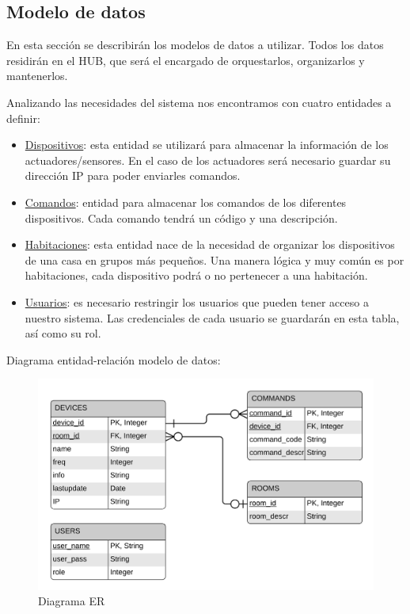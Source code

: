 \subsection{Modelo de datos}
En esta sección se describirán los modelos de datos a utilizar. Todos los datos residirán en el HUB, que será el encargado de orquestarlos,
organizarlos y mantenerlos.
\par
Analizando las necesidades del sistema nos encontramos con cuatro entidades a definir:
\begin{itemize}
\setlength\itemsep{6pt plus 1pt minus 1pt}
\item \underline{Dispositivos}: esta entidad se utilizará para almacenar la información de los actuadores/sensores. En el caso de los actuadores
será necesario guardar su dirección IP para poder enviarles comandos.
\item \underline{Comandos}: entidad para almacenar los comandos de los diferentes dispositivos. Cada comando tendrá un código y una descripción.
\item \underline{Habitaciones}: esta entidad nace de la necesidad de organizar los dispositivos de una casa en grupos más pequeños. Una manera lógica 
y muy común es por habitaciones, cada dispositivo podrá o no pertenecer a una habitación.
\item \underline{Usuarios}: es necesario restringir los usuarios que pueden tener acceso a nuestro sistema. Las credenciales de cada usuario se guardarán en esta tabla,
así como su rol.
\end{itemize}
Diagrama entidad-relación modelo de datos:
\begin{figure}[H]
\centering
\includegraphics[width=6.00in]{images/er_brimo.png}
\caption{Diagrama ER}
\label{fig:diagrama-er}
\end{figure}
